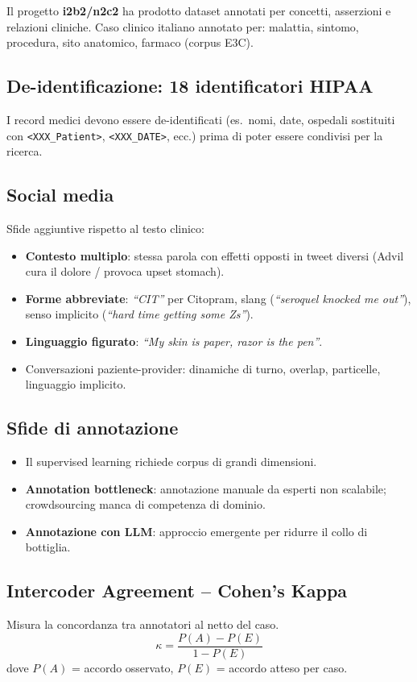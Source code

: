 \documentclass[a4paper,12pt]{article}
\begin{document}
Il progetto \textbf{i2b2/n2c2} ha prodotto dataset annotati per concetti, asserzioni e relazioni cliniche. Caso clinico italiano annotato per: malattia, sintomo, procedura, sito anatomico, farmaco (corpus E3C).

\subsection{De-identificazione: 18 identificatori HIPAA}
I record medici devono essere de-identificati (es.\ nomi, date, ospedali sostituiti con \verb|<XXX_Patient>|, \verb|<XXX_DATE>|, ecc.) prima di poter essere condivisi per la ricerca.

\subsection{Social media}
Sfide aggiuntive rispetto al testo clinico:
\begin{itemize}
    \item \textbf{Contesto multiplo}: stessa parola con effetti opposti in tweet diversi (Advil cura il dolore / provoca upset stomach).
    \item \textbf{Forme abbreviate}: \textit{``CIT''} per Citopram, slang (\textit{``seroquel knocked me out''}), senso implicito (\textit{``hard time getting some Zs''}).
    \item \textbf{Linguaggio figurato}: \textit{``My skin is paper, razor is the pen''}.
    \item Conversazioni paziente-provider: dinamiche di turno, overlap, particelle, linguaggio implicito.
\end{itemize}

\subsection{Sfide di annotazione}
\begin{itemize}
    \item Il supervised learning richiede corpus di grandi dimensioni.
    \item \textbf{Annotation bottleneck}: annotazione manuale da esperti non scalabile; crowdsourcing manca di competenza di dominio.
    \item \textbf{Annotazione con LLM}: approccio emergente per ridurre il collo di bottiglia.
\end{itemize}

\subsection{Intercoder Agreement -- Cohen's Kappa}
Misura la concordanza tra annotatori al netto del caso.
\[
\kappa = \frac{P(A) - P(E)}{1 - P(E)}
\]
dove $P(A)$ = accordo osservato, $P(E)$ = accordo atteso per caso.
\end{document}
